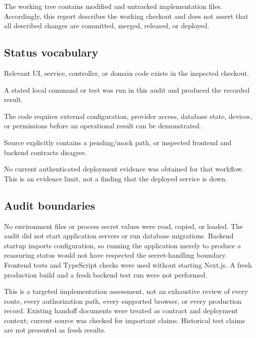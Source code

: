 \documentclass[11pt,a4paper]{article}
\begin{document}
The working tree contains modified and untracked implementation files. Accordingly, this report describes the working checkout and does not assert that all described changes are committed, merged, released, or deployed.

\subsection{Status vocabulary}
\begin{description}[leftmargin=0pt,labelsep=8pt]
\item[Implemented] Relevant UI, service, controller, or domain code exists in the inspected checkout.
\item[Locally verified] A stated local command or test was run in this audit and produced the recorded result.
\item[Integration-dependent] The code requires external configuration, provider access, database state, devices, or permissions before an operational result can be demonstrated.
\item[Incomplete / inconsistent] Source explicitly contains a pending/mock path, or inspected frontend and backend contracts disagree.
\item[Live unverified] No current authenticated deployment evidence was obtained for that workflow. This is an evidence limit, not a finding that the deployed service is down.
\end{description}

\subsection{Audit boundaries}
No environment files or process secret values were read, copied, or loaded. The audit did not start application servers or run database migrations. Backend startup imports configuration, so running the application merely to produce a reassuring status would not have respected the secret-handling boundary. Frontend tests and TypeScript checks were used without starting Next.js. A fresh production build and a fresh backend test run were not performed.

This is a targeted implementation assessment, not an exhaustive review of every route, every authorization path, every supported browser, or every production record. Existing handoff documents were treated as contract and deployment context; current source was checked for important claims. Historical test claims are not presented as fresh results.
\end{document}
